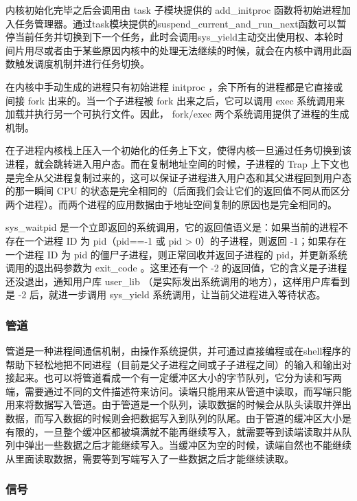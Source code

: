 内核初始化完毕之后会调用由 task 子模块提供的 add\_initproc 函数将初始进程加入任务管理器。通过task模块提供的suspend\_current\_and\_run\_next函数可以暂停当前任务并切换到下一个任务，此时会调用sys\_yield主动交出使用权、本轮时间片用尽或者由于某些原因内核中的处理无法继续的时候，就会在内核中调用此函数触发调度机制并进行任务切换。

在内核中手动生成的进程只有初始进程 initproc ，余下所有的进程都是它直接或间接 fork 出来的。当一个子进程被 fork 出来之后，它可以调用 exec 系统调用来加载并执行另一个可执行文件。因此， fork/exec 两个系统调用提供了进程的生成机制。

在子进程内核栈上压入一个初始化的任务上下文，使得内核一旦通过任务切换到该进程，就会跳转进入用户态。而在复制地址空间的时候，子进程的 Trap 上下文也是完全从父进程复制过来的，这可以保证子进程进入用户态和其父进程回到用户态的那一瞬间 CPU 的状态是完全相同的（后面我们会让它们的返回值不同从而区分两个进程）。而两个进程的应用数据由于地址空间复制的原因也是完全相同的。

sys\_waitpid 是一个立即返回的系统调用，它的返回值语义是：如果当前的进程不存在一个进程 ID 为 pid（pid==-1 或 pid > 0）的子进程，则返回 -1；如果存在一个进程 ID 为 pid 的僵尸子进程，则正常回收并返回子进程的 pid，并更新系统调用的退出码参数为 exit\_code 。这里还有一个 -2 的返回值，它的含义是子进程还没退出，通知用户库 user\_lib （是实际发出系统调用的地方），这样用户库看到是 -2 后，就进一步调用 sys\_yield 系统调用，让当前父进程进入等待状态。

\subsubsection{管道}


管道是一种进程间通信机制，由操作系统提供，并可通过直接编程或在shell程序的帮助下轻松地把不同进程（目前是父子进程之间或子子进程之间）的输入和输出对接起来。也可以将管道看成一个有一定缓冲区大小的字节队列，它分为读和写两端，需要通过不同的文件描述符来访问。读端只能用来从管道中读取，而写端只能用来将数据写入管道。由于管道是一个队列，读取数据的时候会从队头读取并弹出数据，而写入数据的时候则会把数据写入到队列的队尾。由于管道的缓冲区大小是有限的，一旦整个缓冲区都被填满就不能再继续写入，就需要等到读端读取并从队列中弹出一些数据之后才能继续写入。当缓冲区为空的时候，读端自然也不能继续从里面读取数据，需要等到写端写入了一些数据之后才能继续读取。

\subsubsection{信号}

